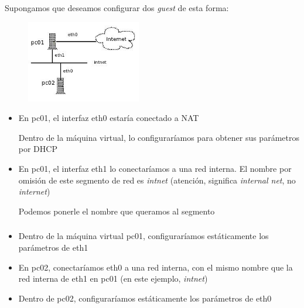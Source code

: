 \documentclass[ucs]{beamer}
\begin{document}
\begin{frame}[fragile]
\frametitle{}
Supongamos que deseamos configurar dos 
\emph{guest}
de esta forma:
\begin{center}
\begin{figure}
\includegraphics[width=5cm]{figs/scen00}
\end{figure}
\end{center}

\begin{itemize}
\item
En pc01, el interfaz eth0 estaría conectado a NAT

Dentro de la máquina virtual, lo configuraríamos para obtener sus parámetros por DHCP
\item
En pc01, el interfaz eth1 lo conectaríamos a una red interna. El nombre
por omisión de este segmento de red es \emph{intnet} (atención, significa
\emph{internal net}, no \emph{internet})

Podemos ponerle el nombre que queramos al segmento
\end{itemize}
\end{frame}


\begin{frame}[fragile]
\frametitle{}
\begin{itemize}
\item
Dentro de la máquina virtual pc01, configuraríamos estáticamente
los parámetros de eth1
\item
En pc02, conectaríamos eth0 a una red interna, con el mismo
nombre que la red interna de eth1 en pc01 (en este ejemplo, \emph{intnet})
\item
Dentro de pc02, configuraríamos estáticamente los parámetros
de eth0
\end{itemize}

\end{frame}


\end{document}
